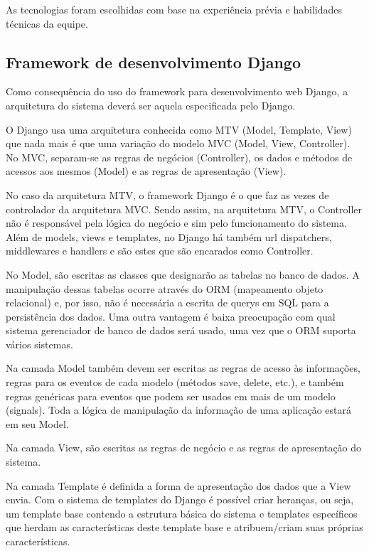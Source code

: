   As tecnologias foram escolhidas com base na experiência prévia e habilidades técnicas da equipe.

  \subsection{Framework de desenvolvimento Django}

    Como consequência do uso do framework para desenvolvimento web Django, a arquitetura do sistema deverá ser aquela especificada pelo Django.

    O Django usa uma arquitetura conhecida como MTV (Model, Template, View) que nada mais é que uma variação do modelo MVC (Model, View, Controller). No MVC, separam-se as regras de negócios (Controller), os dados e métodos de acessos aos mesmos (Model) e as regras de apresentação (View).

    No caso da arquitetura MTV, o framework Django é o que faz as vezes de controlador da arquitetura MVC. Sendo assim, na arquitetura MTV, o Controller não é responsável pela lógica do negócio e sim pelo funcionamento do sistema. Além de models, views e templates, no Django há também url dispatchers, middlewares e handlers e são estes que são encarados como Controller.

    No Model, são escritas as classes que designarão as tabelas no banco de dados. A manipulação dessas tabelas ocorre através do ORM (mapeamento objeto relacional) e, por isso, não é necessária a escrita de querys em SQL para a persistência dos dados. Uma outra vantagem é baixa preocupação com qual sistema gerenciador de banco de dados será usado, uma vez que o ORM suporta vários sistemas.

    Na camada Model também devem ser escritas as regras de acesso às informações, regras para os eventos de cada modelo (métodos save, delete, etc.), e também regras genéricas para eventos que podem ser usados em mais de um modelo (signals). Toda a lógica de manipulação da informação de uma aplicação estará em seu Model.

    Na camada View, são escritas as regras de negócio e as regras de apresentação do sistema.

    Na camada Template é definida a forma de apresentação dos dados que a View envia. Com o sistema de templates do Django é possível criar heranças, ou seja, um template base contendo a estrutura básica do sistema e templates específicos que herdam as características deste template base e atribuem/criam suas próprias características.

